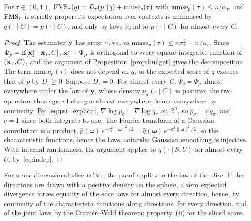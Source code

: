 \begin{proposition}\label{prop:proper}
For $\tau \in (0,1)$, $\mathrm{FMS}_\tau(q) = D_\tau(p \,\|\, q) + \mathrm{mmse}_p(\tau)$ with
$\mathrm{mmse}_p(\tau) \le n/\alpha_\tau$, and $\mathrm{FMS}_\tau$ is strictly proper: its expectation over contexts is
minimised by $q(\cdot \mid C) = p(\cdot \mid C)$, and only by laws equal to $p(\cdot \mid C)$ for almost every $C$.
\end{proposition}
\begin{proof}
The estimator $\mathbf{y}$ has error $\sigma_\tau \mathbf{x}_0$, so $\mathrm{mmse}_p(\tau) \le n\sigma_\tau^2 = n/\alpha_\tau$.
Since $\Psi_p = \mathbb{E}[\mathbf{x}_1^\star \mid \mathbf{x}_\tau, C]$, $\mathbf{x}_1^\star - \Psi_p$ is orthogonal to every square-integrable
function of $(\mathbf{x}_\tau, C)$, and the argument of Proposition~\ref{prop:budget} gives the decomposition. The
term $\mathrm{mmse}_p(\tau)$ does not depend on $q$, so the expected score of $q$ exceeds that of $p$ by
$D_\tau \ge 0$. Suppose $D_\tau = 0$. For almost every $C$, $\Psi_q = \Psi_p$ almost everywhere under the law of
$\mathbf{y}$, whose density $p_\sigma(\cdot \mid C)$ is positive; the two operators thus agree Lebesgue-almost everywhere,
hence everywhere by continuity. By~\eqref{eq:psi_explicit}, $\nabla \log p_\sigma = \nabla \log q_\sigma$ on
$\mathbb{R}^n$, so $p_\sigma = c\, q_\sigma$, and $c = 1$ since both integrate to one. The Fourier transform of a
Gaussian convolution is a product, $\hat p(\boldsymbol{\omega})\, e^{-\sigma_\tau^2\|\boldsymbol{\omega}\|^2/2}
= \hat q(\boldsymbol{\omega})\, e^{-\sigma_\tau^2\|\boldsymbol{\omega}\|^2/2}$, so the characteristic functions,
hence the laws, coincide: Gaussian smoothing is injective. With internal randomness, the argument applies to
$q(\cdot \mid S, U)$ for almost every $U$, by~\eqref{eq:indep}.
\end{proof}

For a one-dimensional slice $\mathbf{u}^\top \mathbf{x}_1$, the proof applies to the law of the slice. If the directions are
drawn with a positive density on the sphere, a zero expected divergence forces equality of the slice laws for almost
every direction, hence, by continuity of the characteristic functions along directions, for every direction, and of
the joint laws by the Cramér--Wold theorem: property~(ii) for the sliced score.

